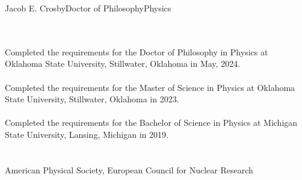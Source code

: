 \newpage
 \begin{vita}{Jacob E. Crosby}{Doctor of Philosophy}{Physics} %

  \\
 \\
Completed the requirements for the Doctor of Philosophy in Physics at Oklahoma State University, Stillwater,  Oklahoma in May, 2024.\\
\\
Completed the requirements for the Master of Science in Physics at Oklahoma State University, Stillwater,  Oklahoma in 2023.\\
\\
Completed the requirements for the Bachelor of Science in Physics at Michigan State University, Lansing, Michigan in 2019.\\

 \\
 \\
 American Physical Society, European Council for Nuclear Research

 \end{vita}
